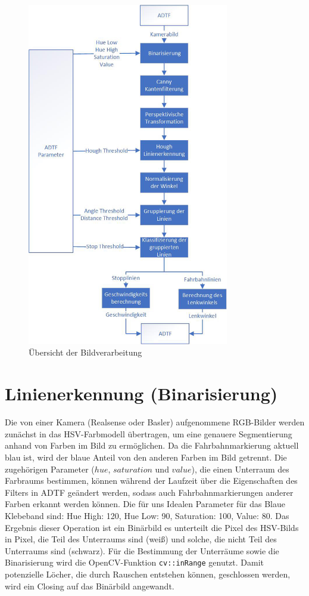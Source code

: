 \documentclass[a4paper,12pt]{report}
\begin{document}
	\begin{figure}[ht]
		\centering
		\includegraphics[width=250pt,keepaspectratio]{assets/bvaFlowchart.jpg}
		\caption{Übersicht der Bildverarbeitung}
		\label{img-bvaFlowchart}
	\end{figure}

\pagebreak

\section{Linienerkennung (Binarisierung)}
	Die von einer Kamera (Realsense oder Basler) aufgenommene RGB-Bilder werden zunächst in das HSV-Farbmodell übertragen, um eine genauere Segmentierung anhand von Farben im Bild zu ermöglichen.
	Da die Fahrbahnmarkierung aktuell blau ist, wird der blaue Anteil von den anderen Farben im Bild getrennt. Die zugehörigen Parameter ($hue$, $saturation$ und $value$), die einen Unterraum des Farbraums bestimmen, können während der Laufzeit über die Eigenschaften des Filters in ADTF geändert werden, sodass auch Fahrbahnmarkierungen anderer Farben erkannt werden können.
	Die für uns Idealen Parameter für das Blaue Klebeband sind:
	Hue High: 120, Hue Low: 90, Saturation: 100, Value: 80.
	Das Ergebnis dieser Operation ist ein Binärbild es unterteilt die Pixel des HSV-Bilds in Pixel, die Teil des Unterraums sind (weiß) und solche, die nicht Teil des Unterraums sind (schwarz). Für die Bestimmung der Unterräume sowie die Binarisierung wird die OpenCV-Funktion \texttt{cv::inRange} genutzt.
	Damit potenzielle Löcher, die durch Rauschen entstehen können, geschlossen werden, wird ein Closing auf das Binärbild angewandt.
\end{document}
